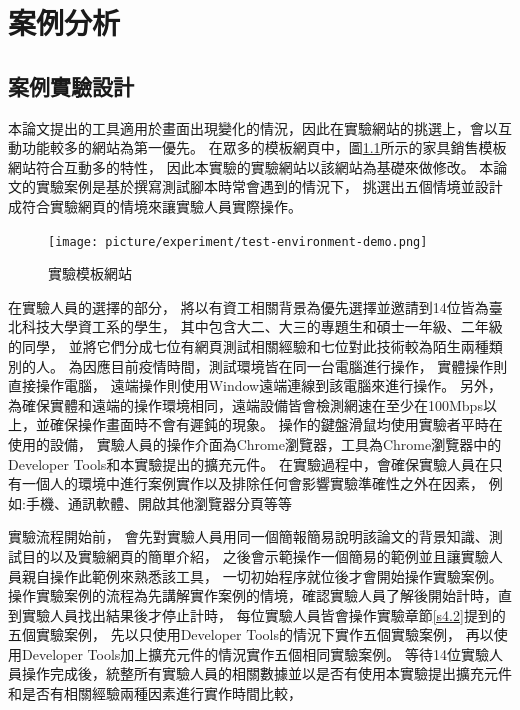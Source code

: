 \chapter{案例分析}
\section{案例實驗設計}\label{s4.1}
\indent
本論文提出的工具適用於畫面出現變化的情況，因此在實驗網站的挑選上，會以互動功能較多的網站為第一優先。
在眾多的模板網頁中，圖\ref{f4.1}所示的家具銷售模板網站\cite{Furn-Free-CSS-Template}符合互動多的特性，
因此本實驗的實驗網站以該網站為基礎來做修改。
本論文的實驗案例是基於撰寫測試腳本時常會遇到的情況下，
挑選出五個情境並設計成符合實驗網頁的情境來讓實驗人員實際操作。

\begin{figure}[H]
    \centering
    \setlength{\abovecaptionskip}{-5pt}
    \setlength{\belowcaptionskip}{0pt}
    \texttt{[image: picture/experiment/test-environment-demo.png]}
    \caption{實驗模板網站}
    \label{f4.1}
\end{figure}

在實驗人員的選擇的部分，
將以有資工相關背景為優先選擇並邀請到14位皆為臺北科技大學資工系的學生，
其中包含大二、大三的專題生和碩士一年級、二年級的同學，
並將它們分成七位有網頁測試相關經驗和七位對此技術較為陌生兩種類別的人。
為因應目前疫情時間，測試環境皆在同一台電腦進行操作，
實體操作則直接操作電腦，
遠端操作則使用Window遠端連線到該電腦來進行操作。
另外，為確保實體和遠端的操作環境相同，遠端設備皆會檢測網速在至少在100Mbps以上，並確保操作畫面時不會有遲鈍的現象。
操作的鍵盤滑鼠均使用實驗者平時在使用的設備，
實驗人員的操作介面為Chrome瀏覽器，工具為Chrome瀏覽器中的Developer Tools和本實驗提出的擴充元件。
在實驗過程中，會確保實驗人員在只有一個人的環境中進行案例實作以及排除任何會影響實驗準確性之外在因素，
例如:手機、通訊軟體、開啟其他瀏覽器分頁等等

實驗流程開始前，
會先對實驗人員用同一個簡報簡易說明該論文的背景知識、測試目的以及實驗網頁的簡單介紹，
之後會示範操作一個簡易的範例並且讓實驗人員親自操作此範例來熟悉該工具，
一切初始程序就位後才會開始操作實驗案例。
操作實驗案例的流程為先講解實作案例的情境，確認實驗人員了解後開始計時，直到實驗人員找出結果後才停止計時，
每位實驗人員皆會操作實驗章節\ref{s4.2}提到的五個實驗案例，
先以只使用Developer Tools的情況下實作五個實驗案例，
再以使用Developer Tools加上擴充元件的情況實作五個相同實驗案例。
等待14位實驗人員操作完成後，統整所有實驗人員的相關數據並以是否有使用本實驗提出擴充元件和是否有相關經驗兩種因素進行實作時間比較，

